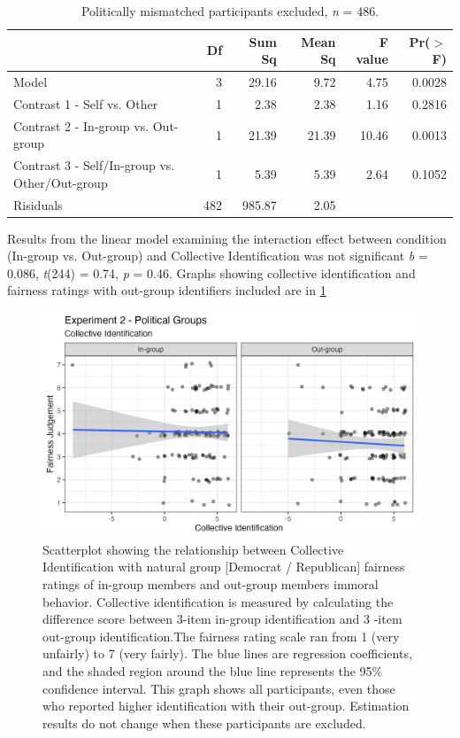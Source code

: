 \documentclass[12pt,]{article}
\begin{document}
\begin{table}[ht]
\centering
\begin{tabular}{lrrrrr}
  \hline
 & Df & Sum Sq & Mean Sq & F value & Pr($>$F) \\ 
  \hline
Model & 3 & 29.16 & 9.72 & 4.75 & 0.0028 \\ 
  Contrast 1 - Self vs. Other & 1 & 2.38 & 2.38 & 1.16 & 0.2816 \\ 
  Contrast 2 - In-group vs. Out-group & 1 & 21.39 & 21.39 & 10.46 & 0.0013 \\ 
  Contrast 3 - Self/In-group vs. Other/Out-group & 1 & 5.39 & 5.39 & 2.64 & 0.1052 \\ 
  Risiduals & 482 & 985.87 & 2.05 &  &  \\ 
   \hline
\end{tabular}
\caption{Politically mismatched participants excluded, \emph{n} = 486.} 
\label{mismatch}
\end{table}

\clearpage

Results from the linear model examining the interaction effect between condition (In-group vs. Out-group) and Collective Identification was not significant \emph{b} = 0.086, \emph{t}(244) = 0.74, \emph{p} = 0.46. Graphs showing collective identification and fairness ratings with out-group identifiers included are in \cref{fig:CID_allS2}

\vspace{0.5cm}

\begin{figure}
	\centering
	\includegraphics{Plots/Study2_CI_all.png}
	\caption{Scatterplot showing the relationship between Collective Identification with natural group [Democrat / Republican] fairness ratings of in-group members and out-group members immoral behavior. Collective identification is measured by calculating the difference score between 3-item in-group identification and 3 -item out-group identification.The fairness rating scale ran from 1 (very unfairly) to 7 (very fairly). The blue lines are regression coefficients, and the shaded region around the blue line represents the 95\% confidence interval. This graph shows all participants, even those who reported higher identification with their out-group. Estimation results do not change when these participants are excluded. }
	\label{fig:CID_allS2}
\end{figure}
\end{document}
